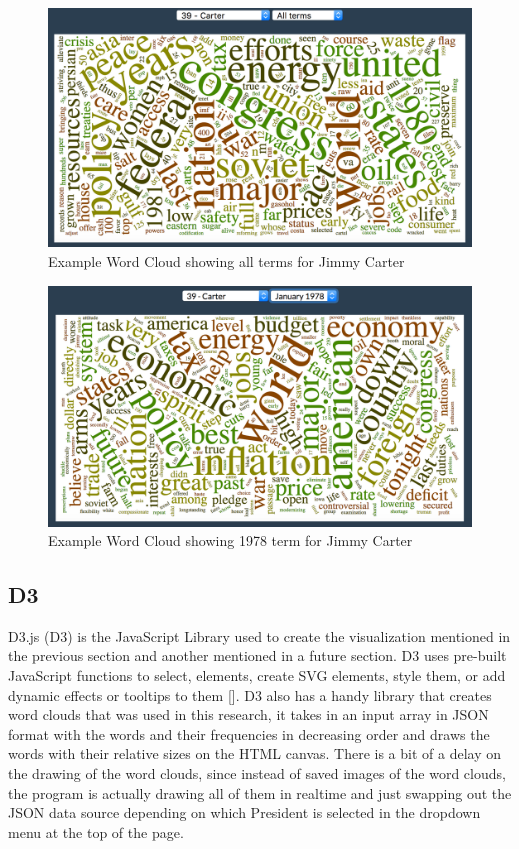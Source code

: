 \begin{figure}
  \includegraphics[width=\columnwidth]{images/Wordcloud.png}
  \caption{Example Word Cloud showing all terms for Jimmy Carter}
  \label{fig:wordcloud1}
\end{figure}

\begin{figure}
  \includegraphics[width=\columnwidth]{images/Wordcloudterm.png}
  \caption{Example Word Cloud showing 1978 term for Jimmy Carter}
  \label{fig:wordcloud2}
\end{figure}

\subsection{D3}
D3.js (D3) is the JavaScript Library used to create the visualization mentioned in the previous section and another mentioned in a future section.
D3 uses pre-built JavaScript functions to select, elements, create SVG elements, style them, or add dynamic effects or tooltips to them [\cite{bostock2011d3}].
D3 also has a handy library that creates word clouds that was used in this research, it takes in an input array in JSON format with the words and their frequencies in decreasing order and draws the words with their relative sizes on the HTML canvas.
There is a bit of a delay on the drawing of the word clouds, since instead of saved images of the word clouds, the program is actually drawing all of them in realtime and just swapping out the JSON data source depending on which President is selected in the dropdown menu at the top of the page.

